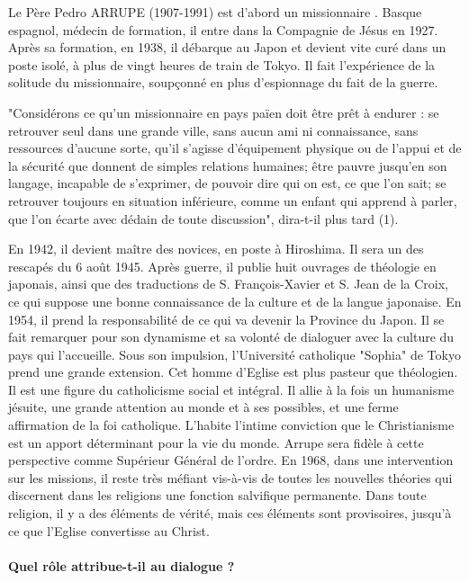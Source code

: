 Le Père Pedro ARRUPE (1907-1991) est d'abord un missionnaire . Basque
espagnol, médecin de formation, il entre dans la Compagnie de Jésus en 1927. Après sa
formation, en 1938, il débarque au Japon et devient vite curé dans un poste isolé, à plus
de vingt heures de train de Tokyo. Il fait l'expérience de la solitude du missionnaire,
soupçonné en plus d'espionnage du fait de la guerre. 
\begin{singlequote}
    "Considérons ce qu'un
missionnaire en pays païen doit être prêt à endurer : se retrouver seul dans une grande
ville, sans aucun ami ni connaissance, sans ressources d'aucune sorte, qu'il s'agisse
d'équipement physique ou de l'appui et de la sécurité que donnent de simples relations
humaines; être pauvre jusqu'en son langage, incapable de s'exprimer, de pouvoir dire qui
on est, ce que l'on sait; se retrouver toujours en situation inférieure, comme un enfant qui
apprend à parler, que l'on écarte avec dédain de toute discussion", dira-t-il plus tard (1).
\end{singlequote}
En 1942, il devient maître des novices, en poste à Hiroshima. Il sera un des
rescapés du 6 août 1945. Après guerre, il publie huit ouvrages de théologie en japonais,
ainsi que des traductions de S. François-Xavier et S. Jean de la Croix, ce qui suppose
une bonne connaissance de la culture et de la langue japonaise. En 1954, il prend la
responsabilité de ce qui va devenir la Province du Japon. Il se fait remarquer pour son
dynamisme et sa volonté de dialoguer avec la culture du pays qui l'accueille. Sous son
impulsion, l'Université catholique "Sophia" de Tokyo prend une grande extension.
Cet homme d'Eglise est plus pasteur que théologien. Il est une figure du
catholicisme social et intégral. Il allie à la fois un humanisme jésuite, une grande attention
au monde et à ses possibles, et une ferme affirmation de la foi catholique. L'habite
l'intime conviction que le Christianisme est un apport déterminant pour la vie du monde.
Arrupe sera fidèle à cette perspective comme Supérieur Général de l'ordre. En 1968, dans
une intervention sur les missions, il reste très méfiant vis-à-vis de toutes les nouvelles
théories qui discernent dans les religions une fonction salvifique permanente. Dans toute
religion, il y a des éléments de vérité, mais ces éléments sont provisoires, jusqu'à ce que
l'Eglise convertisse au Christ. \paragraph{Quel rôle attribue-t-il au dialogue ?} 
